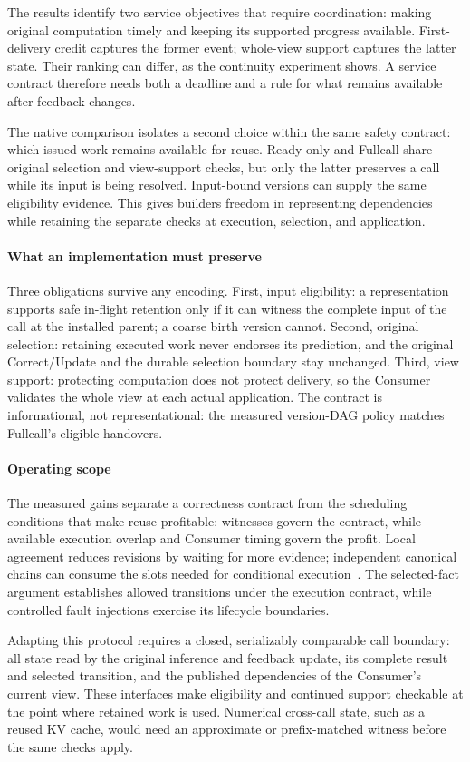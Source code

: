 The results identify two service objectives that require coordination:
making original computation timely and keeping its supported progress
available. First-delivery credit captures the former event; whole-view
support captures the latter state. Their ranking can differ, as the
continuity experiment shows. A service contract therefore needs both a
deadline and a rule for what remains available after feedback changes.

The native comparison isolates a second choice within the same safety
contract: which issued work remains available for reuse. Ready-only and
Fullcall share original selection and view-support checks, but only the
latter preserves a call while its input is being resolved. Input-bound
versions can supply the same eligibility evidence. This gives builders
freedom in representing dependencies while retaining the separate
checks at execution, selection, and application.

\paragraph{What an implementation must preserve}
Three obligations survive any encoding. First, input eligibility:
a representation supports safe in-flight retention only if it can witness
the complete input of the call at the installed parent; a coarse birth
version cannot. Second, original selection: retaining executed work never
endorses its prediction, and the original Correct/Update and the durable
selection boundary stay unchanged. Third, view support: protecting
computation does not protect delivery, so the Consumer validates the
whole view at each actual application. The contract is informational, not
representational: the measured version-DAG policy matches Fullcall's
eligible handovers.

\paragraph{Operating scope}
The measured gains separate a correctness contract from the scheduling
conditions that make reuse profitable: witnesses govern the contract,
while available execution overlap and Consumer timing govern the
profit. Local agreement reduces revisions by waiting for more
evidence; independent canonical chains can consume the slots needed for
conditional execution~\cite{welsh2001seda}. The selected-fact
argument establishes allowed transitions under the execution contract,
while controlled fault injections exercise its lifecycle boundaries.

Adapting this protocol requires a closed, serializably comparable call
boundary: all state read by the original inference and feedback update,
its complete result and selected transition, and the published
dependencies of the Consumer's current view. These interfaces make
eligibility and continued support checkable at the point where retained
work is used. Numerical cross-call state, such as a reused KV cache,
would need an approximate or prefix-matched witness before the same
checks apply.
